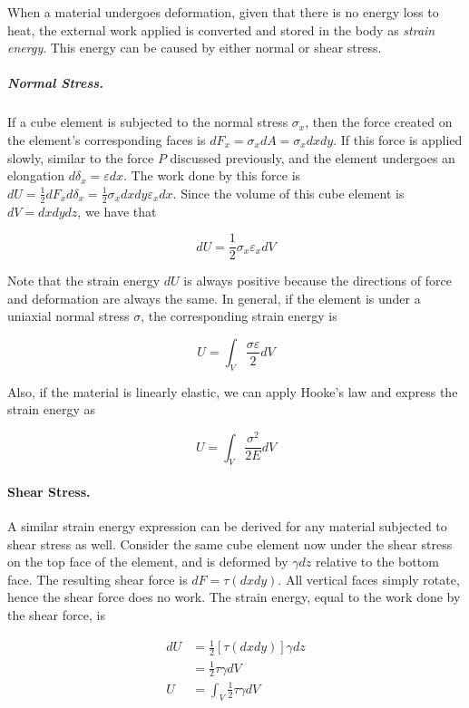 \documentclass[
10pt,
a4paper,
openany,
svgnames,
]{book} %
\begin{document}
When a material undergoes deformation, given that there is no energy loss to heat, the external work applied is converted and stored in the body as \emph{strain energy}. This energy can be caused by either normal or shear stress.

\subparagraph{Normal Stress.}

If a cube element is subjected to the normal stress $\sigma_x$, then the force created on the element's corresponding faces is $dF_x = \sigma_x dA = \sigma_x dx dy$. If this force is applied slowly, similar to the force $P$ discussed previously, and the element undergoes an elongation $d\delta_x = \varepsilon dx$. The work done by this force is $dU = \frac{1}{2}dF_xd\delta_x = \frac{1}{2} \sigma_xdxdy\varepsilon_xdx$. Since the volume of this cube element is $dV = dxdydz$, we have that 

\begin{equation}
  dU = \frac{1}{2}\sigma_x \varepsilon_x dV
\end{equation}

Note that the strain energy $dU$ is always positive because the directions of force and deformation are always the same. In general, if the element is under a uniaxial normal stress $\sigma$, the corresponding strain energy is

\begin{equation}
  U = \int_V \frac{\sigma \varepsilon}{2} dV
\end{equation}

Also, if the material is linearly elastic, we can apply Hooke's law and express the strain energy as

\begin{equation}
  U = \int_V \frac{\sigma^2}{2E} dV
\end{equation}

\paragraph{Shear Stress.}

A similar strain energy expression can be derived for any material subjected to shear stress as well. Consider the same cube element now under the shear stress on the top face of the element, and is deformed by $\gamma dz$ relative to the bottom face. The resulting shear force is $dF = \tau (dx dy)$. All vertical faces simply rotate, hence the shear force does no work. The strain energy, equal to the work done by the shear force, is

\begin{align}
  dU &= \frac{1}{2} \left[ \tau (dx dy) \right] \gamma dz \nonumber \\
     &= \frac{1}{2} \tau \gamma dV \nonumber \\
  U &= \int_V \frac{1}{2} \tau \gamma dV
\end{align}
\end{document}
